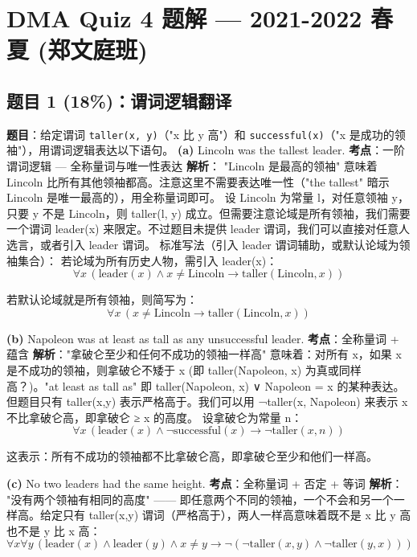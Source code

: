 \documentclass[10pt,a4paper,openany]{ctexbook}
\theoremstyle{definition}
\theoremstyle{remark}
\begin{document}
\section{DMA Quiz 4 题解 — 2021-2022 春夏 (郑文庭班)}

\vspace{-2pt}

\subsection{题目 1 (18\%)：谓词逻辑翻译}

\textbf{题目}：给定谓词 \texttt{taller(x, y)}（"x 比 y 高"）和 \texttt{successful(x)}（"x 是成功的领袖"），用谓词逻辑表达以下语句。
\textbf{(a)} Lincoln was the tallest leader.
\textbf{考点}：一阶谓词逻辑 — 全称量词与唯一性表达
\textbf{解析}： "Lincoln 是最高的领袖" 意味着 Lincoln 比所有其他领袖都高。注意这里不需要表达唯一性（"the tallest" 暗示 Lincoln 是唯一最高的），用全称量词即可。
设 Lincoln 为常量 l，对任意领袖 y，只要 y 不是 Lincoln，则 taller(l, y) 成立。但需要注意论域是所有领袖，我们需要一个谓词 leader(x) 来限定。不过题目未提供 leader 谓词，我们可以直接对任意人选言，或者引入 leader 谓词。
标准写法（引入 leader 谓词辅助，或默认论域为领袖集合）：
若论域为所有历史人物，需引入 leader(x)：
\[
 \forall x \, (\text{leader}(x) \land x \neq \text{Lincoln} \to \text{taller}(\text{Lincoln}, x)) 
\]

若默认论域就是所有领袖，则简写为：
\[
 \forall x \, (x \neq \text{Lincoln} \to \text{taller}(\text{Lincoln}, x)) 
\]

\vspace{-2pt}

\textbf{(b)} Napoleon was at least as tall as any unsuccessful leader.
\textbf{考点}：全称量词 + 蕴含
\textbf{解析}："拿破仑至少和任何不成功的领袖一样高" 意味着：对所有 x，如果 x 是不成功的领袖，则拿破仑不矮于 x (即 taller(Napoleon, x) 为真或同样高？)。"at least as tall as" 即 taller(Napoleon, x) ∨ Napoleon = x 的某种表达。但题目只有 taller(x,y) 表示严格高于。我们可以用 ¬taller(x, Napoleon) 来表示 x 不比拿破仑高，即拿破仑 ≥ x 的高度。
设拿破仑为常量 n：
\[
 \forall x \, (\text{leader}(x) \land \neg \text{successful}(x) \to \neg \text{taller}(x, n)) 
\]

这表示：所有不成功的领袖都不比拿破仑高，即拿破仑至少和他们一样高。
\vspace{-2pt}

\textbf{(c)} No two leaders had the same height.
\textbf{考点}：全称量词 + 否定 + 等词
\textbf{解析}： "没有两个领袖有相同的高度" —— 即任意两个不同的领袖，一个不会和另一个一样高。给定只有 taller(x,y) 谓词（严格高于），两人一样高意味着既不是 x 比 y 高也不是 y 比 x 高：
\[
 \forall x \forall y \, (\text{leader}(x) \land \text{leader}(y) \land x \neq y \to \neg(\neg \text{taller}(x, y) \land \neg \text{taller}(y, x))) 
\]
\end{document}
